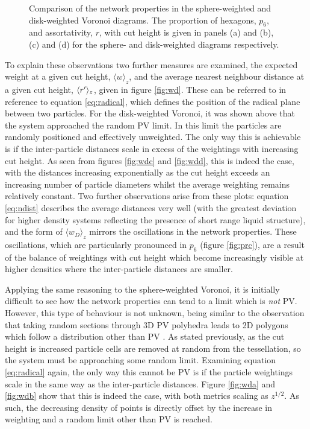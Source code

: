 \begin{figure}[bt]
	\caption{Comparison of the network properties in the sphere\--weighted and disk\--weighted Voronoi diagrams.
	The proportion of hexagons, $p_6$, and assortativity, $r$, with cut height is given in panels (a) and (b), (c) and (d) for the sphere\-- and disk\--weighted diagrams respectively.}
	\label{fig:pr}
\end{figure}

To explain these observations two further measures are examined, the expected weight at a given cut height, $\langle w \rangle_z$, and the average nearest neighbour distance at a given cut height, $\langle r^\prime \rangle_z$, given in figure \ref{fig:wd}.
These can be referred to in reference to equation \eqref{eq:radical}, which defines the position of the radical plane between two particles.
For the disk\--weighted Voronoi, it was shown above that the system approached the random PV limit.
In this limit the particles are randomly positioned and effectively unweighted. 
The only way this is achievable is if the inter\--particle distances scale in excess of the weightings with increasing cut height.
As seen from figures \ref{fig:wdc} and \ref{fig:wdd}, this is indeed the case, with the distances increasing exponentially as the cut height exceeds an increasing number of particle diameters whilst the average weighting remains relatively constant.
Two further observations arise from these plots: equation \eqref{eq:ndist} describes the average distances very well (with the greatest deviation for higher density systems reflecting the presence of short range liquid structure), and the form of $\langle w_D\rangle_z$ mirrors the oscillations in the network properties.
These oscillations, which are particularly pronounced in $p_6$ (figure \ref{fig:prc}), are a result of the balance of weightings with cut height which become increasingly visible at higher densities where the inter\--particle distances are smaller.

Applying the same reasoning to the sphere\--weighted Voronoi, it is initially difficult to see how the network properties can tend to a limit which is \textit{not} PV.
However, this type of behaviour is not unknown, being similar to the observation that taking random sections through 3D PV polyhedra leads to 2D polygons which follow a distribution other than PV \cite{Hahn1994}.
As stated previously, as the cut height is increased particle cells are removed at random from the tessellation, so the system must be approaching some random limit.
Examining equation \eqref{eq:radical} again, the only way this cannot be PV is if the particle weightings scale in the same way as the inter\--particle distances.
Figure \ref{fig:wda} and \ref{fig:wdb} show that this is indeed the case, with both metrics scaling as $z^{1/2}$.
As such, the decreasing density of points is directly offset by the increase in weighting and a random limit other than PV is reached.

